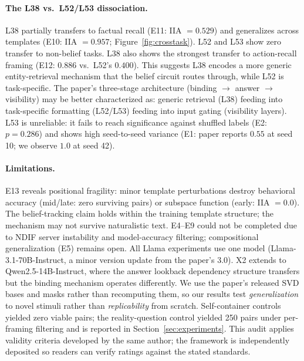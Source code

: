 \documentclass{article}
\begin{document}
\paragraph{The L38 vs.\ L52/L53 dissociation.}
L38 partially transfers to factual recall (E11: IIA $= 0.529$) and generalizes across templates (E10: IIA $= 0.957$; Figure~\ref{fig:crosstask}). L52 and L53 show zero transfer to non-belief tasks. L38 also shows the strongest transfer to action-recall framing (E12: $0.886$ vs.\ L52's $0.400$). This suggests L38 encodes a more generic entity-retrieval mechanism that the belief circuit routes through, while L52 is task-specific. The paper's three-stage architecture (binding $\to$ answer $\to$ visibility) may be better characterized as: generic retrieval (L38) feeding into task-specific formatting (L52/L53) feeding into input gating (visibility layers). L53 is unreliable: it fails to reach significance against shuffled labels (E2: $p = 0.286$) and shows high seed-to-seed variance (E1: paper reports $0.55$ at seed 10; we observe $1.0$ at seed 42).

\paragraph{Limitations.}
E13 reveals positional fragility: minor template perturbations destroy behavioral accuracy (mid/late: zero surviving pairs) or subspace function (early: IIA $= 0.0$). The belief-tracking claim holds within the training template structure; the mechanism may not survive naturalistic text. E4--E9 could not be completed due to NDIF server instability and model-accuracy filtering; compositional generalization (E5) remains open. All Llama experiments use one model (Llama-3.1-70B-Instruct, a minor version update from the paper's 3.0). X2 extends to Qwen2.5-14B-Instruct, where the answer lookback dependency structure transfers but the binding mechanism operates differently. We use the paper's released SVD bases and masks rather than recomputing them, so our results test \emph{generalization} to novel stimuli rather than \emph{replicability} from scratch. Self-container controls yielded zero viable pairs; the reality-question control yielded 250 pairs under per-framing filtering and is reported in Section~\ref{sec:experiments}. This audit applies validity criteria developed by the same author; the framework is independently deposited so readers can verify ratings against the stated standards.
\end{document}
